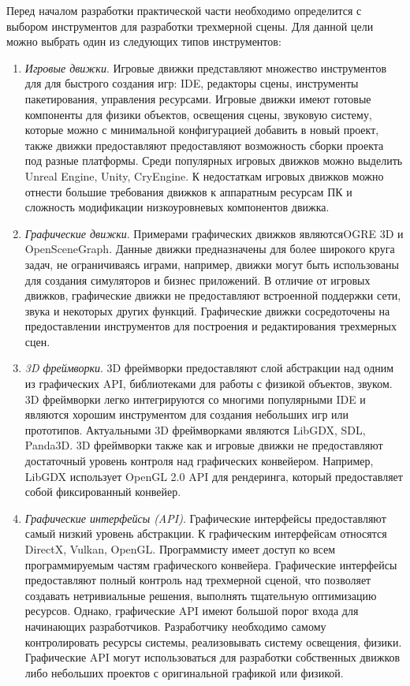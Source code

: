 Перед началом разработки практической части необходимо определится с выбором
инструментов для разработки трехмерной сцены. Для данной цели можно
выбрать один из следующих типов инструментов:
\begin{enumerate}
    \item \emph{Игровые движки}. Игровые движки представляют множество инструментов для
        для быстрого создания игр: IDE, редакторы сцены, инструменты
        пакетирования, управления ресурсами. Игровые движки имеют готовые
        компоненты для физики объектов, освещения сцены, звуковую систему,
        которые можно с минимальной конфигурацией добавить в новый проект, также
        движки предоставляют предоставляют возможность сборки проекта под разные
        платформы. Среди популярных игровых движков можно выделить Unreal
        Engine, Unity, CryEngine. К недостаткам игровых движков можно отнести
        большие требования движков к аппаратным ресурсам ПК и сложность
        модификации низкоуровневых компонентов движка.
    \item \emph{Графические движки}. Примерами графических движков
        являются\break{}OGRE 3D и OpenSceneGraph. Данные движки предназначены
        для более широкого круга задач, не ограничиваясь играми, например,
        движки могут быть использованы для создания симуляторов и бизнес
        приложений. В отличие от игровых движков, графические движки не
        предоставляют встроенной поддержки сети, звука и некоторых других
        функций. Графические движки сосредоточены на предоставлении инструментов
        для построения и редактирования трехмерных сцен.
    \item \emph{3D фреймворки}. 3D фреймворки предоставляют слой абстракции над
        одним из графических API, библиотеками для работы с физикой объектов,
        звуком. 3D фреймворки легко интегрируются со многими популярными IDE и
        являются хорошим инструментом для создания небольших игр или прототипов.
        Актуальными 3D фреймворками являются LibGDX, SDL, Panda3D. 3D фреймворки
        также как и игровые движки не предоставляют достаточный уровень контроля
        над графических конвейером. Например, LibGDX использует OpenGL 2.0 API
        для рендеринга, который предоставляет собой фиксированный конвейер.
    \item \emph{Графические интерфейсы (API)}. Графические интерфейсы
        предоставляют самый низкий уровень абстракции. К графическим интерфейсам
        относятся DirectX, Vulkan, OpenGL\@. Программисту имеет доступ ко всем
        программируемым частям графического конвейера. Графические интерфейсы
        предоставляют полный контроль над трехмерной сценой, что позволяет
        создавать нетривиальные решения, выполнять тщательную оптимизацию
        ресурсов. Однако, графические API имеют большой порог входа для
        начинающих разработчиков. Разработчику необходимо самому контролировать
        ресурсы системы, реализовывать систему освещения, физики. Графические
        API могут использоваться для разработки собственных движков либо
        небольших проектов с оригинальной графикой или физикой.
\end{enumerate}

